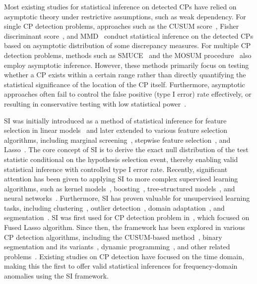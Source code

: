 Most existing studies for statistical inference on detected CPs have relied on asymptotic theory under restrictive assumptions, such as weak dependency.
%
For single CP detection problems, approaches such as the CUSUM score~\citep{page1954continuous}, Fisher discriminant score~\citep{mika1999fisher, harchaoui2009kernel}, and MMD~\citep{li2015m} conduct statistical inference on the detected CPs based on asymptotic distribution of some discrepancy measures.
%
For multiple CP detection problems, methods such as SMUCE~\citep{frick2014multiscale} and the MOSUM procedure~\citep{eichinger2018mosum} also employ asymptotic inference.
%
However, these methods primarily focus on testing whether a CP exists within a certain range rather than directly quantifying the statistical significance of the location of the CP itself.
%
Furthermore, asymptotic approaches often fail to control the false positive (type I error) rate effectively, or resulting in conservative testing with low statistical power~\citep{hyun2018exact}.

SI was initially introduced as a method of statistical inference for feature selection in linear models~\citep{taylor2015statistical, fithian2015selective} and later extended to various feature selection algorithms, including marginal screening~\citep{lee2014exact}, stepwise feature selection~\citep{tibshirani2016exact}, and Lasso~\citep{lee2016exact}. 
% 
The core concept of SI is to derive the exact null distribution of the test statistic conditional on the hypothesis selection event, 
thereby enabling valid statistical inference with controlled type I error rate.
%
Recently, significant attention has been given to applying SI to more complex supervised learning algorithms, such as kernel models~\citep{yamada2018post}, boosting~\citep{rugamer2020inference}, tree-structured models~\citep{neufeld2022tree}, and neural networks~\citep{duy2022quantifying, miwa2023valid, shiraishi2024statistical}.
%
Furthermore, SI has proven valuable for unsupervised learning tasks, including clustering~\citep{lee2015evaluating, chen2023selective, gao2024selective}, outlier detection~\citep{chen2020valid, tsukurimichi2022conditional}, domain adaptation~\citep{le2024cad}, and segmentation~\citep{tanizaki2020computing, duy2022quantifying}.
%
SI was first used for CP detection problem in~\citep{hyun2018exact}, which focused on Fused Lasso algorithm.
%
Since then, the framework has been explored in various CP detection algorithms, including the CUSUM-based method~\citep{umezu2017selective}, binary segmentation and its variants~\citep{hyun2021post}, dynamic programming~\citep{duy2020computing}, and other related problems~\citep{sugiyama2021valid, jewell2022testing, carrington2024post, shiraishi2024selective}.
%
Existing studies on CP detection have focused on the time domain, making this the first to offer valid statistical inferences for frequency-domain anomalies using the SI framework.
